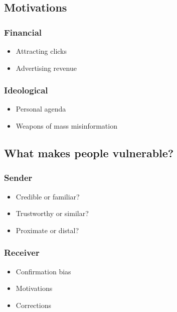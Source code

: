 \documentclass[11pt]{article}
\begin{document}
\subsection{Motivations}
\label{sec:orgd82570a}

\subsubsection{Financial}
\label{sec:org61ede37}
\begin{itemize}
\item Attracting clicks
\item Advertising revenue
\end{itemize}

\subsubsection{Ideological}
\label{sec:org82ed77f}
\begin{itemize}
\item Personal agenda
\item Weapons of mass misinformation
\end{itemize}

\subsection{What makes people vulnerable?}
\label{sec:org39dbbfb}

\subsubsection{Sender}
\label{sec:org1173ca4}
\begin{itemize}
\item Credible or familiar?
\item Trustworthy or similar?
\item Proximate or distal?
\end{itemize}

\subsubsection{Receiver}
\label{sec:org59d6ed9}
\begin{itemize}
\item Confirmation bias
\item Motivations
\item Corrections
\end{itemize}
\end{document}
